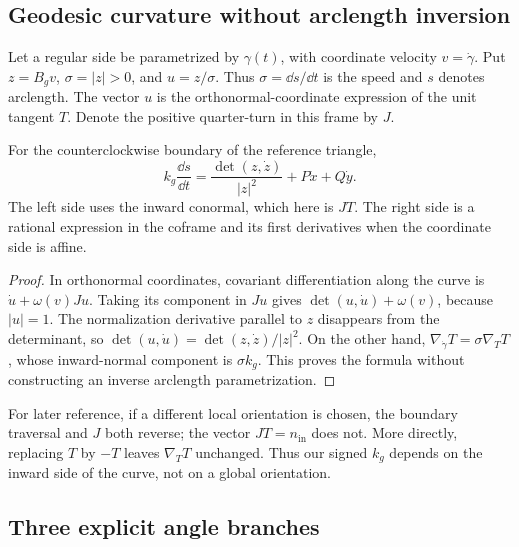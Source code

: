\subsection{Geodesic curvature without arclength inversion}

Let a regular side be parametrized by $\gamma(t)$, with coordinate velocity $v=\dot\gamma$. Put $z=B_gv$, $\sigma=|z|>0$, and $u=z/\sigma$. Thus $\sigma=\dd s/\dd t$ is the speed and $s$ denotes arclength. The vector $u$ is the orthonormal-coordinate expression of the unit tangent $T$. Denote the positive quarter-turn in this frame by $J$.

\begin{lemma}\label{lem:boundary}
For the counterclockwise boundary of the reference triangle,
\begin{equation}\label{eq:kg}
k_g\frac{\dd s}{\dd t}
=\frac{\det(z,\dot z)}{|z|^2}
+P\dot x+Q\dot y.
\end{equation}
The left side uses the inward conormal, which here is $JT$. The right side is a rational expression in the coframe and its first derivatives when the coordinate side is affine.
\end{lemma}
\begin{proof}
In orthonormal coordinates, covariant differentiation along the curve is
$\dot u+\omega(v)Ju$. Taking its component in $Ju$ gives
$\det(u,\dot u)+\omega(v)$, because $|u|=1$. The normalization derivative parallel to $z$ disappears from the determinant, so
$\det(u,\dot u)=\det(z,\dot z)/|z|^2$.
On the other hand, $\nabla_{\dot\gamma}T=\sigma\nabla_TT$, whose inward-normal component is $\sigma k_g$. This proves the formula without constructing an inverse arclength parametrization.
\end{proof}

For later reference, if a different local orientation is chosen, the boundary traversal and $J$ both reverse; the vector $JT=n_{\mathrm{in}}$ does not. More directly, replacing $T$ by $-T$ leaves $\nabla_TT$ unchanged. Thus our signed $k_g$ depends on the inward side of the curve, not on a global orientation.

\subsection{Three explicit angle branches}\label{sec:angles}

\begin{center}
\end{center}

